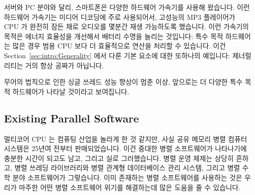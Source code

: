 서버와 PC 분야와 달리, 스마트폰은 다양한 하드웨어 가속기를 사용해 왔습니다.
이런 하드웨어 가속기는 미디어 디코딩에 주로 사용되어서, 고성능의 MP3 플레이어가
CPU 가 완전히 잠든 채로 오디오를 몇분간 재생 가능하도록 했습니다.
이런 가속기의 목적은 에너지 효율성을 개선해서 배터리 수명을 늘리는 것입니다:
특수 목적 하드웨어는 많은 경우 범용 CPU 보다 더 효율적으로 연산을 처리할 수
있습니다.
이건 Section~\ref{sec:intro:Generality} 에서 다룬 기본 요소에 대한 또하나의
예입니다: 제너럴리티는 거의 항상 공짜가 아닙니다.

무어의 법칙으로 인한 싱글 쓰레드 성능 향상이 멈춘 이상, 앞으로는 더 다양한 특수
목적 하드웨어가 나타날 것이라고 보여집니다.
\iffalse

Unlike the server and PC arena, smartphones have long used a wide
variety of hardware accelerators.
These hardware accelerators are often used for media decoding,
so much so that a high-end MP3 player might be able to play audio
for several minutes---with its CPU fully powered off the entire time.
The purpose of these accelerators is to improve energy efficiency
and thus extend battery life: special purpose hardware can often
compute more efficiently than can a general-purpose CPU.
This is another example of the principle called out in
Section~\ref{sec:intro:Generality}: Generality is almost never free.

Nevertheless, given the end of Moore's-Law-induced single-threaded
performance increases, it seems safe to predict that there will
be an increasing variety of special-purpose hardware going forward.
\fi

\subsection{Existing Parallel Software}
\label{sec:cpu:Existing Parallel Software}

멀티코어 CPU 는 컴퓨팅 산업을 놀라게 한 것 같지만, 사실 공유 메모리 병렬 컴퓨터
시스템은 25년여 전부터 판매되었습니다.
이건 중대한 병렬 소프트웨어가 나타나기에 충분한 시간이 되고도 남고, 그리고 실로
그러했습니다.
병렬 운영 체제는 상당히 흔하고, 병렬 쓰레딩 라이브러리와 병렬 관계형
데이터베이스 관리 시스템, 그리고 병렬 수학 분야 소프트웨어가 그렇습니다.
이미 존재하는 병렬 소프트웨어를 사용하는 것은 우리가 마주한 어떤 병렬
소프트웨어 위기를 해결하는데 많은 도움을 줄 수 있습니다.

\iffalse
Although multicore CPUs seem to have taken the computing industry
by surprise, the fact remains that shared-memory parallel computer
systems have been commercially available for more than a quarter
century.
This is more than enough time for significant parallel software
to make its appearance, and it indeed has.
Parallel operating systems are quite commonplace, as are parallel
threading libraries, parallel relational database management systems, 
and parallel numerical software.
Use of existing parallel software can go a long ways towards solving any
parallel-software crisis we might encounter.
\fi

